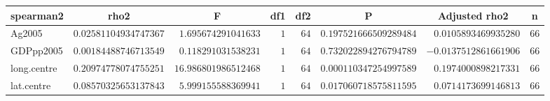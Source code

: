 \begin{table}[!tbp]
\begin{center}
\begin{tabular}{lrrrrrrr}
\hline\hline
\multicolumn{1}{l}{spearman2}&\multicolumn{1}{c}{rho2}&\multicolumn{1}{c}{F}&\multicolumn{1}{c}{df1}&\multicolumn{1}{c}{df2}&\multicolumn{1}{c}{P}&\multicolumn{1}{c}{Adjusted rho2}&\multicolumn{1}{c}{n}\tabularnewline
\hline
Ag2005&$0.02581104934747367$&$ 1.695674291041633$&$1$&$64$&$0.197521666509289484$&$ 0.0105893469935280$&$66$\tabularnewline
GDPpp2005&$0.00184488746713549$&$ 0.118291031538231$&$1$&$64$&$0.732022894276794789$&$-0.0137512861661906$&$66$\tabularnewline
long.centre&$0.20974778074755251$&$16.986801986512468$&$1$&$64$&$0.000110347254997589$&$ 0.1974000898217331$&$66$\tabularnewline
lat.centre&$0.08570325653137843$&$ 5.999155588369941$&$1$&$64$&$0.017060718575811595$&$ 0.0714173699146813$&$66$\tabularnewline
\hline
\end{tabular}\end{center}

\end{table}
